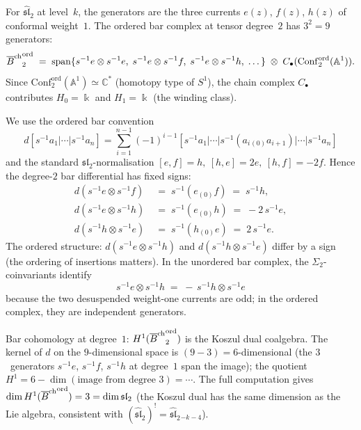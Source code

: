 \begin{computation}
For $\widehat{\mathfrak{sl}}_2$ at level~$k$, the generators
are the three currents $e(z)$, $f(z)$, $h(z)$ of conformal
weight~$1$. The ordered bar complex at tensor degree~$2$
has $3^2=9$ generators:
\[
{\overline{B}^{\mathrm{ch}}}^{\mathrm{ord}}_2
\;=\;
\operatorname{span}\{
s^{-1}e\otimes s^{-1}e,\;
s^{-1}e\otimes s^{-1}f,\;
s^{-1}e\otimes s^{-1}h,\;
\dots\}
\;\otimes\;
C_\bullet(\mathrm{Conf}_2^{\mathrm{ord}}(\mathbb A^1)).
\]
Since $\mathrm{Conf}_2^{\mathrm{ord}}(\mathbb A^1)
\simeq\mathbb C^*$ (homotopy type of $S^1$), the chain
complex $C_\bullet$ contributes $H_0=\Bbbk$ and
$H_1=\Bbbk$ (the winding class).

We use the ordered bar convention
\[
d[s^{-1}a_1|\cdots|s^{-1}a_n]
=
\sum_{i=1}^{n-1}(-1)^{i-1}
[s^{-1}a_1|\cdots|s^{-1}(a_i{}_{(0)}a_{i+1})|\cdots|s^{-1}a_n]
\]
and the standard \(\mathfrak{sl}_2\)-normalisation
\([e,f]=h,\ [h,e]=2e,\ [h,f]=-2f\).  Hence the degree-\(2\)
bar differential has fixed signs:
\begin{align*}
d(s^{-1}e\otimes s^{-1}f)
&\;=\;
s^{-1}(e_{(0)}f)\;=\;s^{-1}h,\\
d(s^{-1}e\otimes s^{-1}h)
&\;=\;
s^{-1}(e_{(0)}h)\;=\;-2\,s^{-1}e,\\
d(s^{-1}h\otimes s^{-1}e)
&\;=\;
s^{-1}(h_{(0)}e)\;=\;2\,s^{-1}e.
\end{align*}
The ordered structure: $d(s^{-1}e\otimes s^{-1}h)$ and
$d(s^{-1}h\otimes s^{-1}e)$ differ by a sign (the ordering
of insertions matters). In the unordered bar complex,
the $\Sigma_2$-coinvariants identify
\[
s^{-1}e\otimes s^{-1}h
\;=\;
-\,s^{-1}h\otimes s^{-1}e
\]
because the two desuspended weight-one currents are odd; in the ordered complex, they
are independent generators.

Bar cohomology at degree~$1$:
$H^1({\overline{B}^{\mathrm{ch}}}^{\mathrm{ord}}_2)$ is the Koszul dual
coalgebra. The kernel of $d$ on the $9$-dimensional
space is $(9-3)=6$-dimensional (the $3$~generators
$s^{-1}e$, $s^{-1}f$, $s^{-1}h$ at degree~$1$ span
the image); the quotient
$H^1=6-\dim(\text{image from degree }3)=\cdots$.
The full computation gives
$\dim H^1({\overline{B}^{\mathrm{ch}}}^{\mathrm{ord}})=3=\dim\mathfrak{sl}_2$
(the Koszul dual has the same dimension as the Lie
algebra, consistent with
$(\widehat{\mathfrak{sl}}_2)^!
=\widehat{\mathfrak{sl}}_2{}_{-k-4}$).


\end{computation}
